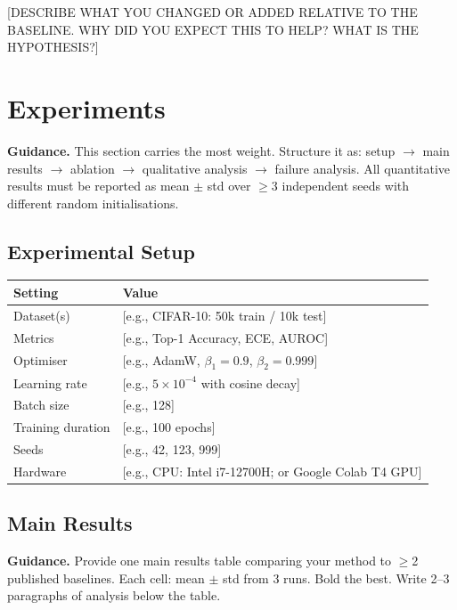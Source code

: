 \documentclass[11pt, letterpaper]{article}
\begin{document}
[DESCRIBE WHAT YOU CHANGED OR ADDED RELATIVE TO THE BASELINE.
WHY DID YOU EXPECT THIS TO HELP? WHAT IS THE HYPOTHESIS?]

\section{Experiments}

\begin{guidancebox}
\textbf{Guidance.} This section carries the most weight. Structure it as:
setup $\to$ main results $\to$ ablation $\to$ qualitative analysis $\to$
failure analysis. All quantitative results must be reported as mean $\pm$ std
over $\geq$3 independent seeds with different random initialisations.
\end{guidancebox}

\subsection{Experimental Setup}

\begin{tabular}{ll}
\toprule
\textbf{Setting} & \textbf{Value} \\
\midrule
Dataset(s) & [e.g., CIFAR-10: 50k train / 10k test] \\
Metrics & [e.g., Top-1 Accuracy, ECE, AUROC] \\
Optimiser & [e.g., AdamW, $\beta_1=0.9$, $\beta_2=0.999$] \\
Learning rate & [e.g., $5\times10^{-4}$ with cosine decay] \\
Batch size & [e.g., 128] \\
Training duration & [e.g., 100 epochs] \\
Seeds & [e.g., 42, 123, 999] \\
Hardware & [e.g., CPU: Intel i7-12700H; or Google Colab T4 GPU] \\
\bottomrule
\end{tabular}

\subsection{Main Results}

\begin{guidancebox}
\textbf{Guidance.} Provide one main results table comparing your method to
$\geq$2 published baselines. Each cell: mean $\pm$ std from 3 runs. Bold the best.
Write 2--3 paragraphs of analysis below the table.
\end{guidancebox}
\end{document}

